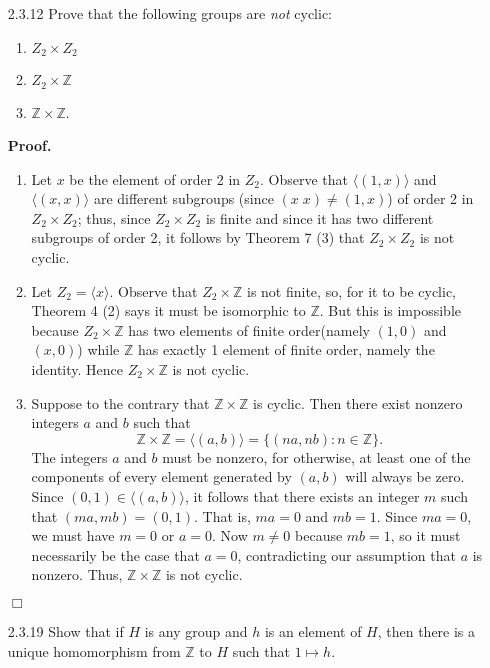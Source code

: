 \documentclass[9pt]{article}
\newcommand{\qed}{\hfill \ensuremath{\Box}}
\newcommand{\cyc}[1]{\langle #1 \rangle}
\newcommand{\Z}{\mathbb{Z}}
\begin{document}
\begin{enumerate}
   \item[2.3.12]  Prove that the following groups are \textit{not} cyclic:
                  \begin{enumerate}
                     \item $Z_2 \times Z_2$
                     \item $Z_2 \times \Z$
                     \item $\Z \times \Z$.
                  \end{enumerate}
      
      \textbf{Proof.}
      \begin{enumerate}
         \item Let $x$ be the element of order 2 in $Z_2$. Observe that
               $\cyc{(1, x)}$ and $\cyc{(x, x)}$ are different subgroups
               (since $(x\;x) \neq (1, x)$) of order 2 in $Z_2 \times Z_2$;
               thus, since $Z_2 \times Z_2$ is finite and since it has two
               different subgroups of order 2, it follows by Theorem 7 (3) that
               $Z_2 \times Z_2$ is not cyclic.
         \item Let $Z_2 = \cyc{x}$. Observe that $Z_2 \times \Z$ is not finite,
               so, for it to be cyclic, Theorem 4 (2) says it must be isomorphic
               to $\Z$. But this is impossible because $Z_2 \times \Z$ has two
               elements of finite order(namely $(1, 0)$ and $(x, 0)$) while
               $\Z$ has exactly 1 element of finite order, namely the identity.
               Hence $Z_2 \times \Z$ is not cyclic.
         \item Suppose to the contrary that $\Z \times \Z$ is cyclic. Then there
               exist nonzero integers $a$ and $b$ such that
               $$\Z \times \Z = \cyc{(a,b)} = \{(na, nb) : n \in \Z\}.$$
               The integers $a$ and $b$ must be nonzero, for otherwise, at least
               one of the components of every element generated by $(a, b)$
               will always be zero. Since $(0, 1) \in \cyc{(a, b)}$, it follows
               that there exists an integer $m$ such that
               $(ma, mb) = (0, 1)$. That is, $ma = 0$ and $mb = 1$. Since
               $ma = 0$, we must have $m = 0$ or $a = 0$. Now $m \neq 0$
               because $mb = 1$, so it must necessarily be the case that
               $a = 0$, contradicting our assumption that $a$ is nonzero. Thus,
               $\Z \times \Z$ is not cyclic.
      \end{enumerate} \qed
   \item[2.3.19]  Show that if $H$ is any group and $h$ is an element of $H$,
                  then there is a unique homomorphism from $\Z$ to $H$ such that
                  $1 \mapsto h$.
                  

\end{enumerate}
\end{document}
